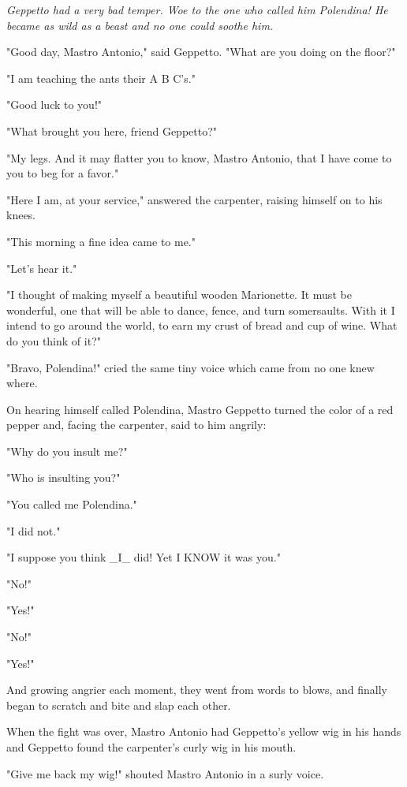 \documentclass[12pt,twoside]{article}
\begin{document}
\bigskip
{\slshape%
  Geppetto had a very bad temper.  Woe to the one who
  called him Polendina!  He became as wild as a beast and
  no one could soothe him.
  
  "Good day, Mastro Antonio," said Geppetto.  "What
  are you doing on the floor?"
  
  "I am teaching the ants their A B C's."
  
  "Good luck to you!"
  
  "What brought you here, friend Geppetto?"
  
  "My legs.  And it may flatter you to know, Mastro
  Antonio, that I have come to you to beg for a favor."
  
  "Here I am, at your service," answered the carpenter,
  raising himself on to his knees.
  
  "This morning a fine idea came to me."
  
  "Let's hear it."
  
  "I thought of making myself a beautiful wooden
  Marionette.  It must be wonderful, one that will be able to
  dance, fence, and turn somersaults.  With it I intend to go
  around the world, to earn my crust of bread and cup of
  wine.  What do you think of it?"
  
  "Bravo, Polendina!" cried the same tiny voice which
  came from no one knew where.
  
  On hearing himself called Polendina, Mastro Geppetto
  turned the color of a red pepper and, facing the carpenter,
  said to him angrily:
  
  "Why do you insult me?"
  
  "Who is insulting you?"
  
  "You called me Polendina."
  
  "I did not."
  
  "I suppose you think \_I\_ did!  Yet I KNOW it was you."
  
  "No!"
  
  "Yes!"
  
  "No!"
  
  "Yes!"
  
  And growing angrier each moment, they went from
  words to blows, and finally began to scratch and bite and
  slap each other.
  
  When the fight was over, Mastro Antonio had Geppetto's
  yellow wig in his hands and Geppetto found the carpenter's
  curly wig in his mouth.
  
  "Give me back my wig!" shouted Mastro Antonio in a surly voice.
  
}
\end{document}
